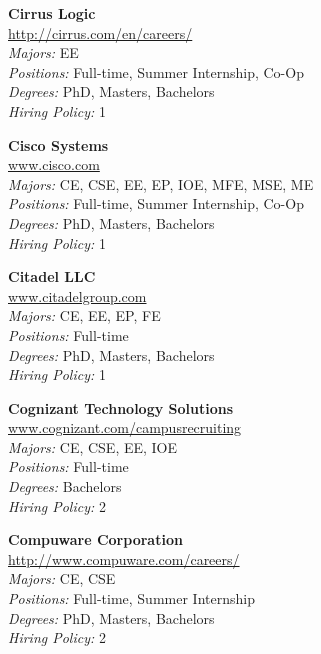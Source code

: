 \documentclass{article}
\begin{document}
\begin{center}
\begin{multicols}{3}
\begin{minipage}{.9\columnwidth}{\Large\bf Cirrus Logic }\\
	\url{http://cirrus.com/en/careers/}\\
	\emph{Majors:} EE\\
	\emph{Positions:} Full-time, Summer Internship, Co-Op\\
	\emph{Degrees:} PhD, Masters, Bachelors\\
	\emph{Hiring Policy:} 1\\
\end{minipage}
 
\begin{minipage}{.9\columnwidth}{\Large\bf Cisco Systems }\\
	\url{www.cisco.com}\\
	\emph{Majors:} CE, CSE, EE, EP, IOE, MFE, MSE, ME\\
	\emph{Positions:} Full-time, Summer Internship, Co-Op\\
	\emph{Degrees:} PhD, Masters, Bachelors\\
	\emph{Hiring Policy:} 1\\
\end{minipage}
 
\begin{minipage}{.9\columnwidth}{\Large\bf Citadel LLC }\\
	\url{www.citadelgroup.com}\\
	\emph{Majors:} CE, EE, EP, FE\\
	\emph{Positions:} Full-time\\
	\emph{Degrees:} PhD, Masters, Bachelors\\
	\emph{Hiring Policy:} 1\\
\end{minipage}
 
\begin{minipage}{.9\columnwidth}{\Large\bf Cognizant Technology Solutions }\\
	\url{www.cognizant.com/campusrecruiting}\\
	\emph{Majors:} CE, CSE, EE, IOE\\
	\emph{Positions:} Full-time\\
	\emph{Degrees:} Bachelors\\
	\emph{Hiring Policy:} 2\\
\end{minipage}
 
\begin{minipage}{.9\columnwidth}{\Large\bf Compuware Corporation }\\
	\url{http://www.compuware.com/careers/}\\
	\emph{Majors:} CE, CSE\\
	\emph{Positions:} Full-time, Summer Internship\\
	\emph{Degrees:} PhD, Masters, Bachelors\\
	\emph{Hiring Policy:} 2\\
\end{minipage}
 

\end{multicols}
\end{center}
\end{document}
